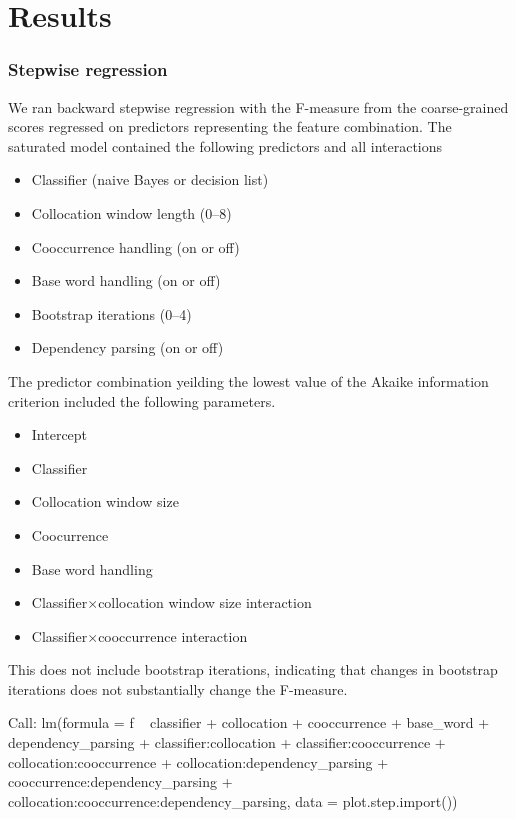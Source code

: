 \documentclass{article}
\begin{document}
\section{Results}

\subsubsection{Stepwise regression}
We ran backward stepwise regression with the F-measure from the coarse-grained scores
regressed on predictors representing the feature combination.
The saturated model contained the following predictors and all interactions
\begin{itemize}
\item Classifier (naive Bayes or decision list)
\item Collocation window length (0--8)
\item Cooccurrence handling (on or off)
\item Base word handling (on or off)
\item Bootstrap iterations (0--4)
\item Dependency parsing (on or off)
\end{itemize}
The predictor combination yeilding the lowest value of the Akaike information criterion
included the following parameters.
\begin{itemize}
\item Intercept
\item Classifier
\item Collocation window size
\item Coocurrence
\item Base word handling
\item Classifier$\times$collocation window size interaction
\item Classifier$\times$cooccurrence interaction
\end{itemize}
This does not include bootstrap iterations, indicating that changes
in bootstrap iterations does not substantially change the F-measure.


Call:
lm(formula = f ~ classifier + collocation + cooccurrence + base_word +     dependency_parsing + classifier:collocation + classifier:cooccurrence +     collocation:cooccurrence + collocation:dependency_parsing +     cooccurrence:dependency_parsing + collocation:cooccurrence:dependency_parsing,     data = plot.step.import())
\end{document}
